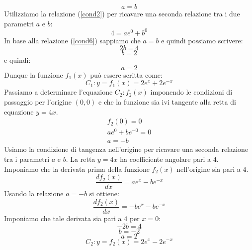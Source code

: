 \documentclass[a4paper,12pt]{article}
\begin{document}
\begin{enumerate}
\begin{equation}\label{cond6}a=b\end{equation}
Utilizziamo la relazione (\ref{cond2}) per ricavare una seconda relazione tra i due parametri $a$ e $b$:
\begin{equation}4=ae^0+b^0\end{equation}
In base alla relazione (\ref{cond6}) sappiamo che $a=b$ e quindi possiamo scrivere:
\begin{equation}2b=4\end{equation}
\begin{equation}b=2\end{equation}
e quindi:
\begin{equation}a=2\end{equation}
Dunque la funzione $f_1(x)$ può essere scritta come:
\begin{equation}C_1: y =f_1(x) = 2e^x+2e^{-x}\end{equation}
Passiamo a determinare l'equazione $C_2:f_2(x)$ imponendo le condizioni di passaggio per l'origine $(0,0)$ e che la funzione sia ivi tangente alla retta di equazione $y=4x$.
%
\begin{subequations}\label{cond3}
\begin{eqnarray}
f_2(0)=0\\
ae^0+be^{-0}=0\\
a=-b
\end{eqnarray}
\end{subequations}
%
Usiamo la condizione di tangenza nell'origine per ricavare una seconda relazione tra i parametri $a$ e $b$. La retta $y=4x$ ha coefficiente angolare pari a $4$. Imponiamo che la derivata prima della funzione $f_2(x)$ nell'origine sia pari a $4$.
\begin{equation}\frac{df_2(x)}{dx}=ae^x-be^{-x}\end{equation}
Usando la relazione $a=-b$ si ottiene:
\begin{equation}\frac{df_2(x)}{dx}=-be^x-be^{-x}\end{equation}
Imponiamo che tale derivata sia pari a $4$ per $x=0$:
\begin{equation}-2b=4\end{equation}
\begin{equation}b=-2\end{equation}
\begin{equation}a=2\end{equation}
\begin{equation}C_2: y=f_2(x)=2e^x-2e^{-x}\end{equation}


\end{enumerate}
\end{document}

